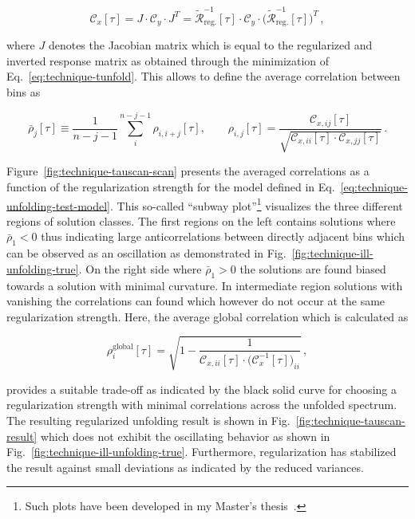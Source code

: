 \begin{equation}
\mathcal{C}_{x}[\tau]=J\cdot\mathcal{C}_{y}\cdot J^{T}=\tilde{\mathcal{R}}^{-1}_\mathrm{reg.}[\tau]\cdot\mathcal{C}_{y}\cdot\big(\tilde{\mathcal{R}}^{-1}_\mathrm{reg.}[\tau]\big)^{T}\,,
\end{equation}

where $J$ denotes the Jacobian matrix which is equal to the regularized and inverted response matrix as obtained through the minimization of Eq.~\ref{eq:technique-tunfold}. This allows to define the average correlation between bins as

\begin{equation}
\bar{\rho}_{j}[\tau]\equiv\frac{1}{n-j-1}\sum_{i}^{n-j-1}\rho_{i,i+j}[\tau],\qquad \rho_{i,j}[\tau]=\frac{\mathcal{C}_{x,ij}[\tau]}{\sqrt{\mathcal{C}_{x,ii}[\tau]\cdot\mathcal{C}_{x,jj}[\tau]}}\,.\label{eq:technique-avg-correlation}
\end{equation}

Figure~\ref{fig:technique-tauscan-scan} presents the averaged correlations as a function of the regularization strength for the model defined in Eq.~\ref{eq:technique-unfolding-test-model}. This so-called ``subway plot''\footnote{Such plots have been developed in my Master's thesis~\cite{Komm-thesis}.} visualizes the three different regions of solution classes. The first regions on the left contains solutions where $\bar{\rho}_{1}<0$ thus indicating large anticorrelations between directly adjacent bins which can be observed as an oscillation as demonstrated in Fig.~\ref{fig:technique-ill-unfolding-true}. On the right side where $\bar{\rho}_{1}>0$ the solutions are found biased towards a solution with minimal curvature. In intermediate region solutions with vanishing the correlations can found which however do not occur at the same regularization strength. Here, the average global correlation which is calculated as

\begin{equation}
\rho^\mathrm{global}_{ i}[\tau]=\sqrt{1-\frac{1}{\mathcal{C}_{x,ii}[\tau]\cdot\big(\mathcal{C}_{x}^{-1}[\tau]\big)_{ii}}}\,,\label{eq:technique-global-correlation}
\end{equation}

provides a suitable trade-off as indicated by the black solid curve for choosing a regularization strength with minimal correlations across the unfolded spectrum. The resulting regularized unfolding result is shown in Fig.~\ref{fig:technique-tauscan-result} which does not exhibit the oscillating behavior as shown in Fig.~\ref{fig:technique-ill-unfolding-true}. Furthermore, regularization has stabilized the result against small deviations as indicated by the reduced variances.

